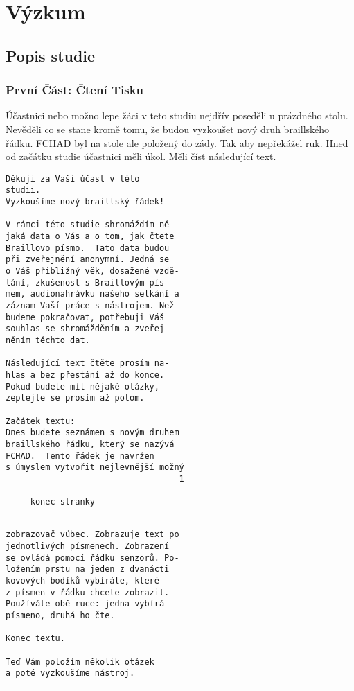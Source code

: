 \chapter{Výzkum}

\section{Popis studie}

\subsection{První Část: Čtení Tisku}

Účastnici nebo možno lepe žáci v teto studiu nejdřív poseděli u prázdného stolu.  Nevěděli co se stane kromě tomu, že budou vyzkoušet nový druh braillského řádku.  FCHAD byl na stole ale položený do zády. Tak aby nepřekážel ruk.  Hned od začátku studie účastnici měli úkol.  Měli číst následující text.

\begin{verbatim}
Děkuji za Vaši účast v této
studii.
Vyzkoušíme nový braillský řádek!

V rámci této studie shromáždím ně-
jaká data o Vás a o tom, jak čtete
Braillovo písmo.  Tato data budou
při zveřejnění anonymní. Jedná se
o Váš přibližný věk, dosažené vzdě-
lání, zkušenost s Braillovým pís-
mem, audionahrávku našeho setkání a
záznam Vaší práce s nástrojem. Než
budeme pokračovat, potřebuji Váš
souhlas se shromážděním a zveřej-
něním těchto dat.

Následující text čtěte prosím na-
hlas a bez přestání až do konce.
Pokud budete mít nějaké otázky,
zeptejte se prosím až potom.

Začátek textu:
Dnes budete seznámen s novým druhem
braillského řádku, který se nazývá
FCHAD.  Tento řádek je navržen
s úmyslem vytvořit nejlevnější možný
                                   1

---- konec stranky ----
\end{verbatim}
\begin{verbatim}

zobrazovač vůbec. Zobrazuje text po
jednotlivých písmenech. Zobrazení
se ovládá pomocí řádku senzorů. Po-
ložením prstu na jeden z dvanácti
kovových bodíků vybíráte, které
z písmen v řádku chcete zobrazit.
Používáte obě ruce: jedna vybírá
písmeno, druhá ho čte.

Konec textu.

Teď Vám položím několik otázek
a poté vyzkoušíme nástroj.
 ---------------------
\end{verbatim}

